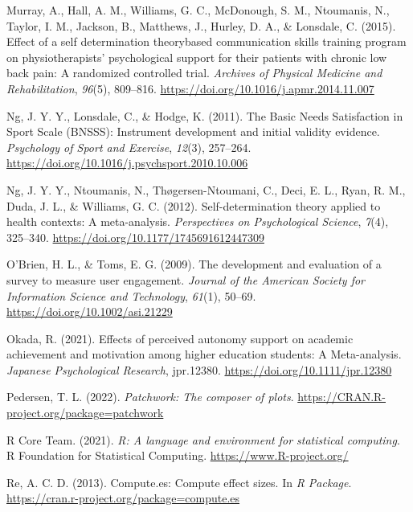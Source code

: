 \documentclass[
  doc, donotrepeattitle,floatsintext]{apa7}
\newlength{\cslhangindent}
\newlength{\cslentryspacingunit} %
\newenvironment{CSLReferences}[2] %
 {%
  \setlength{\parindent}{0pt}
  \ifodd #1
  \let\oldpar\par
  \def\par{\hangindent=\cslhangindent\oldpar}
  \fi
  \setlength{\parskip}{#2\cslentryspacingunit}
 }%
 {}
\begin{document}
\begin{CSLReferences}{1}{0}
\leavevmode{}%
Murray, A., Hall, A. M., Williams, G. C., McDonough, S. M., Ntoumanis, N., Taylor, I. M., Jackson, B., Matthews, J., Hurley, D. A., \& Lonsdale, C. (2015). Effect of a self determination theory\textendash based communication skills training program on physiotherapists' psychological support for their patients with chronic low back pain: {A} randomized controlled trial. \emph{Archives of Physical Medicine and Rehabilitation}, \emph{96}(5), 809--816. \url{https://doi.org/10.1016/j.apmr.2014.11.007}

\leavevmode{}%
Ng, J. Y. Y., Lonsdale, C., \& Hodge, K. (2011). The {Basic Needs Satisfaction} in {Sport Scale} ({BNSSS}): {Instrument} development and initial validity evidence. \emph{Psychology of Sport and Exercise}, \emph{12}(3), 257--264. \url{https://doi.org/10.1016/j.psychsport.2010.10.006}

\leavevmode{}%
Ng, J. Y. Y., Ntoumanis, N., Thøgersen-Ntoumani, C., Deci, E. L., Ryan, R. M., Duda, J. L., \& Williams, G. C. (2012). Self-determination theory applied to health contexts: {A} meta-analysis. \emph{Perspectives on Psychological Science}, \emph{7}(4), 325--340. \url{https://doi.org/10.1177/1745691612447309}

\leavevmode{}%
O'Brien, H. L., \& Toms, E. G. (2009). The development and evaluation of a survey to measure user engagement. \emph{Journal of the American Society for Information Science and Technology}, \emph{61}(1), 50--69. \url{https://doi.org/10.1002/asi.21229}

\leavevmode{}%
Okada, R. (2021). Effects of perceived autonomy support on academic achievement and motivation among higher education students: {A Meta-analysis}. \emph{Japanese Psychological Research}, jpr.12380. \url{https://doi.org/10.1111/jpr.12380}

\leavevmode{}%
Pedersen, T. L. (2022). \emph{Patchwork: The composer of plots}. \url{https://CRAN.R-project.org/package=patchwork}

\leavevmode{}%
R Core Team. (2021). \emph{R: A language and environment for statistical computing}. R Foundation for Statistical Computing. \url{https://www.R-project.org/}

\leavevmode{}%
Re, A. C. D. (2013). Compute.es: Compute effect sizes. In \emph{R Package}. \url{https://cran.r-project.org/package=compute.es}


\end{CSLReferences}
\end{document}
